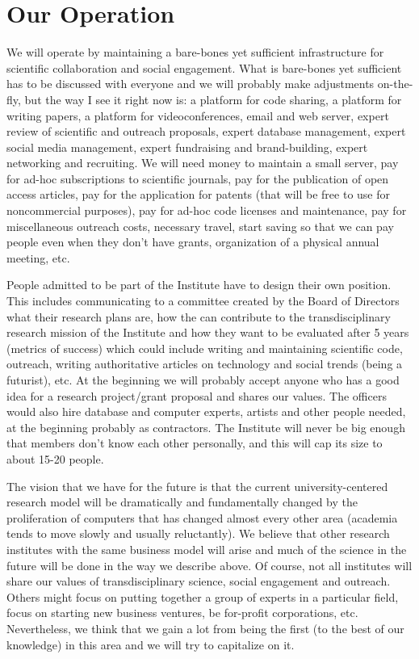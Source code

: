 \section{Our Operation}

We will operate by maintaining a bare-bones yet sufficient infrastructure for scientific collaboration and social engagement. What is bare-bones yet sufficient has to be discussed with everyone and we will probably make adjustments on-the-fly, but the way I see it right now is: a platform for code sharing, a platform for writing papers, a platform for videoconferences, email and web server, expert review of scientific and outreach proposals, expert database management, expert social media management, expert fundraising and brand-building, expert networking and recruiting. We will need money to maintain a small server, pay for ad-hoc subscriptions to scientific journals, pay for the publication of open access articles, pay for the application for patents (that will be free to use for noncommercial purposes), pay for ad-hoc code licenses and maintenance, pay for miscellaneous outreach costs, necessary travel, start saving so that we can pay people even when they don't have grants, organization of a physical annual meeting, etc. 

People admitted to be part of the Institute have to design their own position. This includes communicating to a committee created by the Board of Directors what their research plans are, how the can contribute to the transdisciplinary research mission of the Institute and how they want to be evaluated after 5 years (metrics of success) which could include writing and maintaining scientific code, outreach, writing authoritative articles on technology and social trends (being a futurist), etc. At the beginning we will probably accept anyone who has a good idea for a research project/grant proposal and shares our values. The officers would also hire database and computer experts, artists and other people needed, at the beginning probably as contractors. The Institute will never be big enough that members don't know each other personally, and this will cap its size to about 15-20 people.

The vision that we have for the future is that the current university-centered research model will be dramatically and fundamentally changed by the proliferation of computers that has changed almost every other area (academia tends to move slowly and usually reluctantly). We believe that other research institutes with the same business model will arise and much of the science in the future will be done in the way we describe above. Of course, not all institutes will share our values of transdisciplinary science, social engagement and outreach. Others might focus on putting together a group of experts in a particular field, focus on starting new business ventures, be for-profit corporations, etc. Nevertheless, we think that we gain a lot from being the first (to the best of our knowledge) in this area and we will try to capitalize on it.

